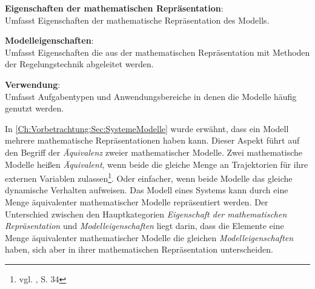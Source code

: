 \textbf{Eigenschaften der mathematischen Repräsentation}: \\
Umfasst Eigenschaften der mathematische Repräsentation des Modells.   %

\textbf{Modelleigenschaften}: \\ %
Umfasst Eigenschaften die aus der mathematischen Repräsentation mit Methoden der Regelungstechnik abgeleitet werden.

\textbf{Verwendung}: \\
Umfasst Aufgabentypen und Anwendungsbereiche in denen die Modelle häufig genutzt werden.

In \ref{Ch:Vorbetrachtung:Sec:SystemeModelle} wurde erwähnt, dass ein Modell mehrere mathematische Repräsentationen haben kann. Dieser Aspekt führt auf den Begriff der \textit{Äquivalenz} zweier mathematischer Modelle. Zwei mathematische Modelle heißen \textit{Äquivalent}, wenn beide die gleiche Menge an Trajektorien für ihre externen Variablen zulassen\footnote{vgl. \cite{SCH89}, S. 34}. Oder einfacher, wenn beide Modelle das gleiche dynamische Verhalten aufweisen. Das Modell eines Systems kann durch eine Menge äquivalenter mathematischer Modelle repräsentiert werden. Der Unterschied zwischen den Hauptkategorien \textit{Eigenschaft der mathematischen Repräsentation} und \textit{Modelleigenschaften} liegt darin, dass die Elemente eine Menge äquivalenter mathematischer Modelle die gleichen \textit{Modelleigenschaften} haben, sich aber in ihrer mathematischen Repräsentation unterscheiden.

